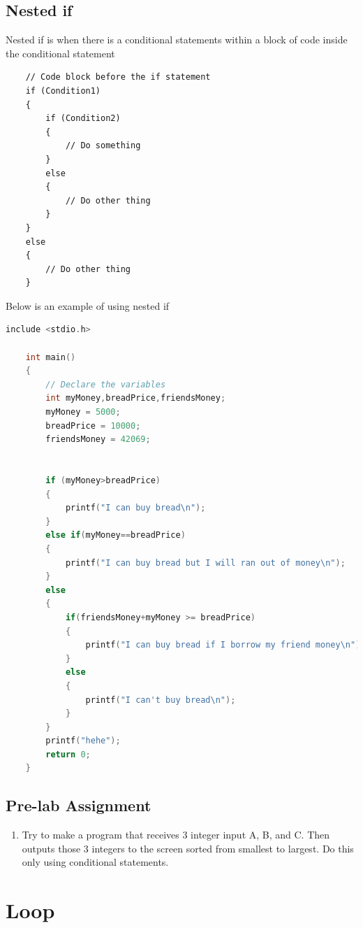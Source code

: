 \subsection{Nested if}
Nested if is when there is a conditional statements within a block of code inside the conditional statement
\begin{verbatim}
	// Code block before the if statement
	if (Condition1) 
	{
		if (Condition2)
		{
			// Do something
		}
		else
		{
			// Do other thing
		}
	} 
	else
	{
		// Do other thing
	}
\end{verbatim}

Below is an example of using nested if

\begin{lstlisting}[language=c,caption = Nested if example,label=lst:nestedifexample01]
	include <stdio.h>
	
	int main()
	{
		// Declare the variables
		int myMoney,breadPrice,friendsMoney;
		myMoney = 5000;
		breadPrice = 10000;
		friendsMoney = 42069;
		
		
		if (myMoney>breadPrice)
		{
		    printf("I can buy bread\n");
		}
		else if(myMoney==breadPrice)
		{
		    printf("I can buy bread but I will ran out of money\n");
		}
		else
		{
		    if(friendsMoney+myMoney >= breadPrice)
		    {
		        printf("I can buy bread if I borrow my friend money\n"); 
		    }
		    else
		    {
	            printf("I can't buy bread\n");	
		    }
		}
		printf("hehe");
		return 0;
	}
\end{lstlisting}


\subsection{Pre-lab Assignment}
\begin{enumerate}
	\item Try to make a program that receives 3 integer input A, B, and C. Then outputs those 3 integers to the screen sorted from smallest to largest. Do this only using conditional statements.	
\end{enumerate}

\section{Loop}
